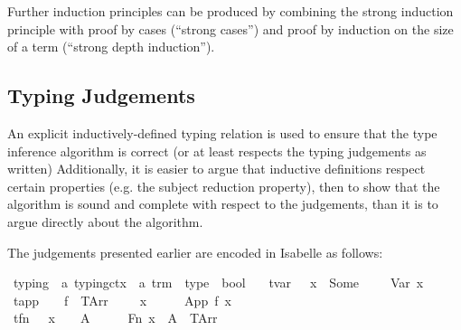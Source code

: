 Further induction principles can be produced by combining the strong induction principle with proof by cases (``strong cases'') and proof by induction on the size of a term (``strong depth induction'').

\subsection{Typing Judgements}
An explicit inductively-defined typing relation is used to ensure that the type inference algorithm is correct (or at least respects the typing judgements as written)
Additionally, it is easier to argue that inductive definitions respect certain properties (e.g. the subject reduction property), then to show that the algorithm is sound and complete with respect to the judgements, than it is to argue directly about the algorithm.

The judgements presented earlier are encoded in Isabelle as follows:

\begin{implementation}
\isamarkupfalse%
\ typing\ {\isacharcolon}{\isacharcolon}\ {\isachardoublequoteopen}{\isacharprime}a\ typing{\isacharunderscore}ctx\ {\isasymRightarrow}\ {\isacharprime}a\ trm\ {\isasymRightarrow}\ type\ {\isasymRightarrow}\ bool{\isachardoublequoteclose}\  \isanewline
\ \ tvar{\isacharcolon}\ \ {\isachardoublequoteopen}{\isasymGamma}\ x\ {\isacharequal}\ Some\ {\isasymtau}\ {\isasymLongrightarrow}\ {\isasymGamma}\ {\isasymturnstile}\ Var\ x\ {\isacharcolon}\ {\isasymtau}{\isachardoublequoteclose}\isanewline
{\isacharbar}\ tapp{\isacharcolon}\ \ {\isachardoublequoteopen}{\isasymlbrakk}{\isasymGamma}\ {\isasymturnstile}\ f\ {\isacharcolon}\ {\isacharparenleft}TArr\ {\isasymtau}\ {\isasymsigma}{\isacharparenright}{\isacharsemicolon}\ {\isasymGamma}\ {\isasymturnstile}\ x\ {\isacharcolon}\ {\isasymtau}{\isasymrbrakk}\ {\isasymLongrightarrow}\ {\isasymGamma}\ {\isasymturnstile}\ App\ f\ x\ {\isacharcolon}\ {\isasymsigma}{\isachardoublequoteclose}\isanewline
{\isacharbar}\ tfn{\isacharcolon}\ \ \ {\isachardoublequoteopen}{\isasymGamma}{\isacharparenleft}x\ {\isasymmapsto}\ {\isasymtau}{\isacharparenright}\ {\isasymturnstile}\ A\ {\isacharcolon}\ {\isasymsigma}\ {\isasymLongrightarrow}\ {\isasymGamma}\ {\isasymturnstile}\ Fn\ x\ {\isasymtau}\ A\ {\isacharcolon}\ {\isacharparenleft}TArr\ {\isasymtau}\ {\isasymsigma}{\isacharparenright}{\isachardoublequoteclose}\isanewline
\end{implementation}

